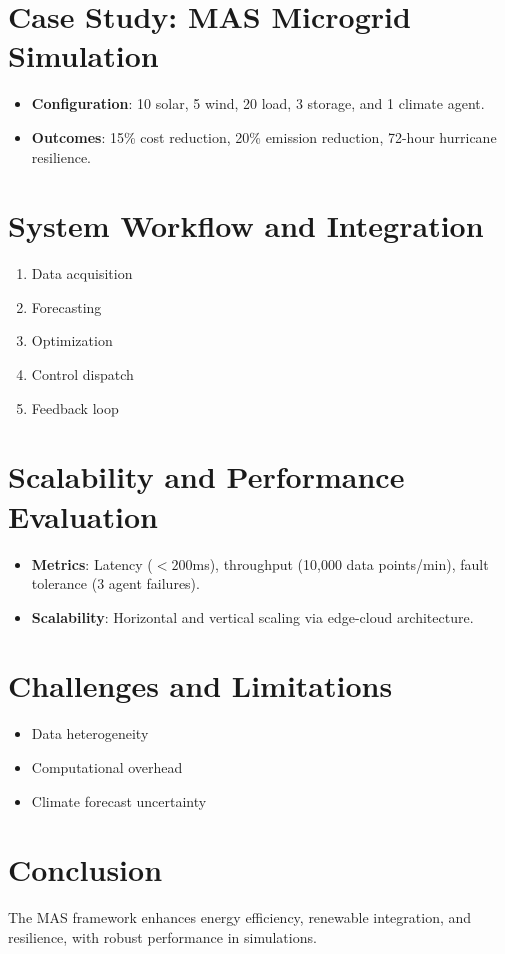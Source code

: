 \documentclass[12pt, a4paper, oneside]{book}
\begin{document}
\section{Case Study: MAS Microgrid Simulation}
\begin{itemize}
    \item \textbf{Configuration}: 10 solar, 5 wind, 20 load, 3 storage, and 1 climate agent.
    \item \textbf{Outcomes}: 15\% cost reduction, 20\% emission reduction, 72-hour hurricane resilience.
\end{itemize}

\section{System Workflow and Integration}
\begin{enumerate}
    \item Data acquisition
    \item Forecasting
    \item Optimization
    \item Control dispatch
    \item Feedback loop
\end{enumerate}

\section{Scalability and Performance Evaluation}
\begin{itemize}
    \item \textbf{Metrics}: Latency ($<200$ms), throughput (10,000 data points/min), fault tolerance (3 agent failures).
    \item \textbf{Scalability}: Horizontal and vertical scaling via edge-cloud architecture.
\end{itemize}

\section{Challenges and Limitations}
\begin{itemize}
    \item Data heterogeneity
    \item Computational overhead
    \item Climate forecast uncertainty
\end{itemize}

\section{Conclusion}
The MAS framework enhances energy efficiency, renewable integration, and resilience, with robust performance in simulations.
\end{document}
